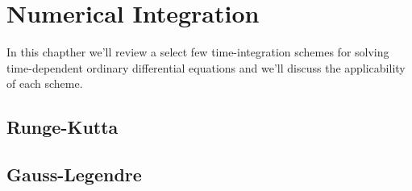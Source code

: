 \chapter{Numerical Integration}
    In this chapther we'll review a select few time-integration schemes for
    solving time-dependent ordinary differential equations and we'll discuss the
    applicability of each scheme.

    \section{Runge-Kutta}
    \section{Gauss-Legendre}
